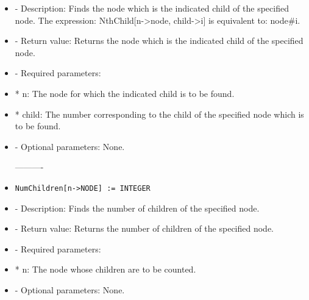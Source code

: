 \begin{itemize}
\begin{verbatim}
\bd
\item
*  E:  The problem in extensive form for which a new outcome is to
be created.
\ed

\item
- Optional parameters:

\bd
\item
*  outc:  Allows the user to specify the number given to the new 
outcome created.  If not specified, the new outcome is assigned the 
lowest positive number for which no otcome is defined.  If the number
specified already exists as an outcome, no action is taken and the 
procedure returns a value of zero.
\ed
\ed

----------
\item
\begin{verbatim}
NthChild[n->NODE, child->INTEGER] =: NODE
\end{verbatim}

\bd
\item
- Description:  Finds the node which is the indicated child of the 
specified node.  The expression:  NthChild[n->node, child->i] is 
equivalent to:  node\#i.
\item
- Return value:  Returns the node which is the indicated child of the
specified node.
\item- Required parameters:
	  
\bd
\item
*  n:  The node for which the indicated child is to be found.
\item
*  child:  The number corresponding to the child of the specified 
node which is to be found.
\ed

\item 
- Optional parameters:  None.
\ed

----------

\item
\begin{verbatim}
NumChildren[n->NODE] := INTEGER
\end{verbatim}

\bd
\item
- Description:  Finds the number of children of the specified node.
\item
- Return value:  Returns the number of children of the specified node.
\item
- Required parameters:

\bd
\item
*  n:  The node whose children are to be counted.
\ed

\item
- Optional parameters:  None.
\ed


\end{itemize}
